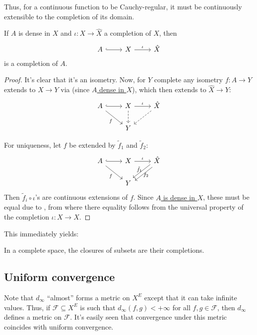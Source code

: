 	Thus, for a continuous function to be Cauchy-regular, it must be continuously extensible to the completion of its domain.
	
	\begin{cor}\label{COR: completion via denseness}
		If $A$ is dense in $X$ and $\iota\colon X\to \hat X$ a completion of $X$, then
		\[
		\begin{tikzcd}
			A\ar[r, hook] & X\ar[r, "\iota"] & \hat X
		\end{tikzcd}
		\]
		is a completion of $A$.
	\end{cor}
	
	\begin{proof}
		It's clear that it's an isometry. Now, for $Y$ complete any isometry $f\colon A\to Y$ extends to $X\to Y$ via  (since \uline{$A$ dense in $X$}), which then extends to $\hat X\to Y$:
		\[
		\begin{tikzcd}
			A\ar[r, hook]\ar[dr, "f"'] & X\ar[r, "\iota"]\ar[d, dashed] & \hat X\ar[dl, dashed]\\
			& Y &
		\end{tikzcd}
		\]
		
		For uniqueness, let $f$ be extended by $\tilde f_1$ and $\tilde f_2$:
		\[
		\begin{tikzcd}
			A\ar[r, hook]\ar[dr, "f"'] & X\ar[r, "\iota"] & \hat X\ar[dl, shift left, "\tilde f_1"']\ar[dl, shift right, "f_2"]\\
			& Y &
		\end{tikzcd}
		\]
		Then $\tilde f_i\circ \iota$'s are continuous extensions of $f$. Since \uline{$A$ is dense in $X$}, these must be equal due to , from where there equality follows from the universal property of the completion $\iota\colon X\to\hat X$.
	\end{proof}
	
	This immediately yields:
	
	\begin{cor}
		In a complete space, the closures of subsets are their completions.
	\end{cor}
	
	
	
	
\subsection{Uniform convergence}

	Note that $d_\infty$ ``almost'' forms a metric on $X^E$ except that it can take infinite values. Thus, if $\mathscr F\subseteq X^E$ is such that $d_\infty(f, g) < +\infty$ for all $f, g\in \mathscr F$, then $d_\infty$ defines a metric on $\mathscr F$. It's easily seen that convergence under this metric coincides with uniform convergence.
	
